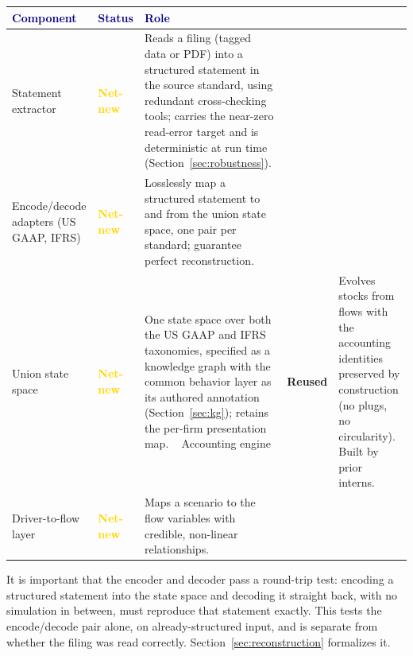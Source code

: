 \documentclass[11pt]{article}
\newcommand{\headtext}[1]{\textcolor{navy}{\textbf{#1}}}
\begin{document}
\vspace{6pt}
\noindent\begin{minipage}{\linewidth}
\renewcommand{\arraystretch}{1.12}
\begin{tabularx}{\linewidth}{>{\raggedright\arraybackslash}p{3.1cm} >{\raggedright\arraybackslash}p{1.9cm} X}
\hline
{} \headtext{Component} & \headtext{Status} & \headtext{Role} \\ \hline
Statement extractor & \textbf{\textcolor{gold}{Net-new}} & Reads a filing (tagged data or PDF) into a structured statement in the source standard, using redundant cross-checking tools; carries the near-zero read-error target and is deterministic at run time (Section~\ref{sec:robustness}). \\ \hline
Encode/decode adapters (US GAAP, IFRS) & \textbf{\textcolor{gold}{Net-new}} & Losslessly map a structured statement to and from the union state space, one pair per standard; guarantee perfect reconstruction. \\ \hline
Union state space & \textbf{\textcolor{gold}{Net-new}} & One state space over both the US GAAP and IFRS taxonomies, specified as a knowledge graph with the common behavior layer as its authored annotation (Section~\ref{sec:kg}); retains the per-firm presentation map. \ \hline
Accounting engine & \textbf{\textcolor{fgreen}{Reused}} & Evolves stocks from flows with the accounting identities preserved by construction (no plugs, no circularity). Built by prior interns. \\ \hline
Driver-to-flow layer & \textbf{\textcolor{gold}{Net-new}} & Maps a scenario to the flow variables with credible, non-linear relationships. \\ \hline
\end{tabularx}
\label{tab:components}
\end{minipage}

It is important that the encoder and decoder pass a round-trip test: encoding a structured statement into the state space and decoding it straight back, with no simulation in between, must reproduce that statement exactly. This tests the encode/decode pair alone, on already-structured input, and is separate from whether the filing was read correctly. Section~\ref{sec:reconstruction} formalizes it.
\end{document}
